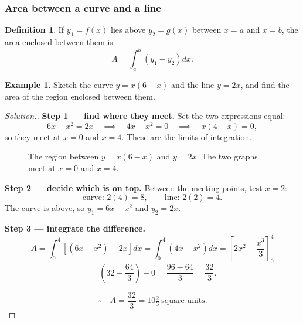 \documentclass[11pt,a4paper]{article}
\theoremstyle{definition}
\newtheorem{definition}[thm]{Definition}
\newtheorem{example}[thm]{Example}
\newenvironment{solution}
  {\renewcommand{\qedsymbol}{}\begin{proof}[\textit{Solution}.]}
  {\end{proof}}
\begin{document}
\subsubsection{Area between a curve and a line}

\begin{definition}
If $y_1=f(x)$ lies above $y_2=g(x)$ between $x=a$ and $x=b$, the area enclosed between
them is
$$A=\int_a^b\left(y_1-y_2\right)dx.$$
\end{definition}

\begin{example}
Sketch the curve $y=x(6-x)$ and the line $y=2x$, and find the area of the region
enclosed between them.
\end{example}

\begin{solution}
\textbf{Step 1 --- find where they meet.} Set the two expressions equal:
$$6x-x^2=2x\quad\implies\quad 4x-x^2=0\quad\implies\quad x(4-x)=0,$$
so they meet at $x=0$ and $x=4$. These are the limits of integration.

\begin{figure}[H]
\centering
{}
\caption{The region between $y=x(6-x)$ and $y=2x$. The two graphs meet at $x=0$ and $x=4$.}
\end{figure}

\textbf{Step 2 --- decide which is on top.} Between the meeting points, test $x=2$:
$$\text{curve: } 2(4)=8,\qquad \text{line: } 2(2)=4.$$
The curve is above, so $y_1=6x-x^2$ and $y_2=2x$.

\textbf{Step 3 --- integrate the difference.}
$$A=\int_0^4\left[\left(6x-x^2\right)-2x\right]dx=\int_0^4\left(4x-x^2\right)dx
=\left[2x^2-\frac{x^3}{3}\right]_0^4$$
$$=\left(32-\frac{64}{3}\right)-0=\frac{96-64}{3}=\frac{32}{3}.$$

$$\therefore\quad A=\frac{32}{3}=10\tfrac{2}{3}\ \text{square units}.$$


\end{solution}
\end{document}
